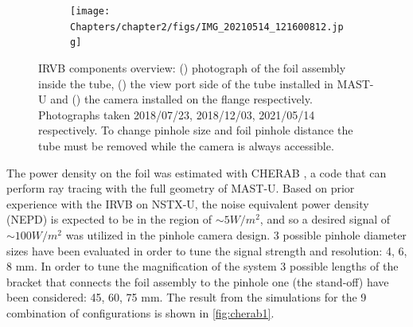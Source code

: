 \begin{figure}
\begin{subfigure}{0.49\linewidth}
         \caption{}
         \label{fig:IRVB5}
     \end{subfigure}
     \centering
     \begin{subfigure}{0.8\linewidth}
         \texttt{[image: Chapters/chapter2/figs/IMG\_20210514\_121600812.jpg]}
         \caption{}
         \label{fig:IRVB6}
     \end{subfigure}

    \caption{IRVB components overview: () photograph of the foil assembly inside the tube, () the view port side of the tube installed in MAST-U and () the camera installed on the flange respectively. Photographs taken 2018/07/23, 2018/12/03, 2021/05/14 respectively. To change pinhole size and foil pinhole distance the tube must be removed while the camera is always accessible.}
    \label{fig:IRVB_components}
\end{figure}

The power density on the foil was estimated with CHERAB \cite{C.GiroudA.MeakinsM.CarrA.Baciero2018,Carr2017,A.MeakinsCarrM.2017}, a code that can perform ray tracing with the full geometry of MAST-U. Based on prior experience with the IRVB on NSTX-U\cite{Reinke2018}, the noise equivalent power density (NEPD) is expected to be in the region of $\sim5 W/m^2$, and so a desired signal of $\sim100 W/m^2$ was utilized in the pinhole camera design. 3 possible pinhole diameter sizes have been evaluated in order to tune the signal strength and resolution: 4, 6, 8 mm. In order to tune the magnification of the system 3 possible lengths of the bracket that connects the foil assembly to the pinhole one (the stand-off) have been considered: 45, 60, 75 mm. The result from the simulations for the 9 combination of configurations is shown in \autoref{fig:cherab1}.

